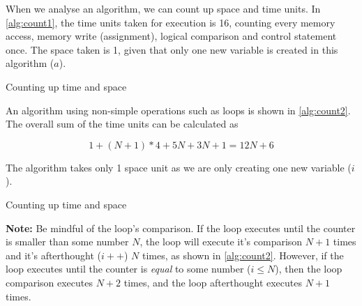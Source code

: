 When we analyse an algorithm, we can count up space and time units. In \autoref{alg:count1}, the time units taken for execution is 16, counting every memory access, memory write (assignment), logical comparison and control statement once. The space taken is 1, given that only one new variable is created in this algorithm ($a$).

\begin{algorithm}[H]
    \caption{Counting up time and space}
    \label{alg:count1}
    \begin{algorithmic}
         
         
         
        \EndIf{}
         
         
        \EndIf{}
         
        \EndFunction{}
    \end{algorithmic}
\end{algorithm}

An algorithm using non-simple operations such as loops is shown in \autoref{alg:count2}. The overall sum of the time units can be calculated as

\[
    1 + (N+1) * 4 + 5N + 3N + 1 = 12N + 6
\]

The algorithm takes only 1 space unit as we are only creating one new variable ($i$).

\begin{algorithm}[H]
    \caption{Counting up time and space}
    \label{alg:count2}
    \begin{algorithmic}
         
         
         
        \EndIf{}
        \EndFor{} 
         
        \EndFunction{}
    \end{algorithmic}
\end{algorithm}

\textbf{Note:} Be mindful of the loop's comparison. If the loop executes until the counter is smaller than some number $N$, the loop will execute it's comparison $N+1$ times and it's afterthought ($i++$) $N$ times, as shown in \autoref{alg:count2}. However, if the loop executes until the counter is \emph{equal} to some number ($i \leq N$), then the loop comparison executes $N+2$ times, and the loop afterthought executes $N+1$ times.

